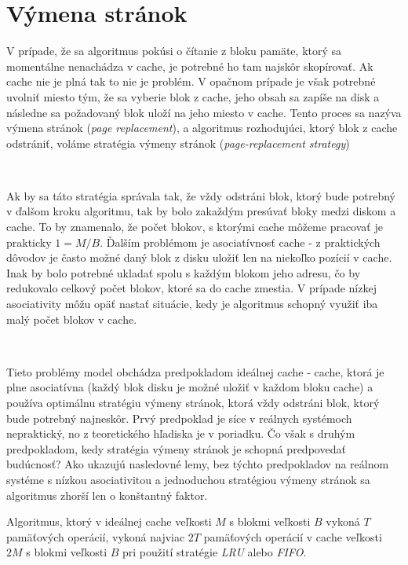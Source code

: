\section{Výmena stránok}

V prípade, že sa \obliv algoritmus pokúsi o čítanie z bloku pamäte, ktorý sa momentálne nenachádza v cache, je potrebné ho tam najskôr skopírovať. Ak cache nie je plná tak to nie je problém. V opačnom prípade je však potrebné uvolniť miesto tým, že sa vyberie blok z cache, jeho obsah sa zapíše na disk a následne sa požadovaný blok uloží na jeho miesto v cache. Tento proces sa nazýva výmena stránok ({\em page replacement}), a algoritmus rozhodujúci, ktorý blok z cache odstrániť, voláme stratégia výmeny stránok ({\em page-replacement strategy})

\

Ak by sa táto stratégia správala tak, že vždy odstráni blok, ktorý bude potrebný v ďalšom kroku algoritmu, tak by bolo zakaždým presúvať bloky medzi diskom a cache. To by znamenalo, že počet blokov, s ktorými cache môžeme pracovať je prakticky $1 = M/B$. Ďalším problémom je asociatívnosť cache - z praktických dôvodov je často možné daný blok z disku uložiť len na niekoľko pozícií v cache. Inak by bolo potrebné ukladať spolu s každým blokom jeho adresu, čo by redukovalo celkový počet blokov, ktoré sa do cache zmestia. V prípade nízkej asociativity môžu opäť nastať situácie, kedy je algoritmus schopný využiť iba malý počet blokov v cache.

\

Tieto problémy \obliv model obchádza predpokladom ideálnej cache - cache, ktorá je plne asociatívna (každý blok disku je možné uložiť v každom bloku cache) a používa optimálnu stratégiu výmeny stránok, ktorá vždy odstráni blok, ktorý bude potrebný najneskôr. Prvý predpoklad je síce v reálnych systémoch nepraktický, no z teoretického hľadiska je v poriadku. Čo však s druhým predpokladom, kedy stratégia výmeny stránok je schopná predpovedať budúcnosť? Ako ukazujú nasledovné lemy, bez týchto predpokladov na reálnom systéme s nízkou asociativitou a jednoduchou stratégiou výmeny stránok sa algoritmus zhorší len o konštantný faktor.

\begin{lema}
Algoritmus, ktorý v ideálnej cache veľkosti $M$ s blokmi veľkosti $B$ vykoná $T$ pamäťových operácií, vykoná najviac $2T$ pamäťových operácií v cache veľkosti $2M$ s blokmi veľkosti $B$ pri použití stratégie {\em LRU} alebo {\em FIFO}. \citep[Lemma 12]{FrigoLePr99}
\end{lema}

